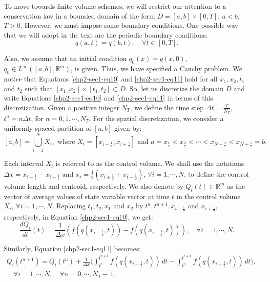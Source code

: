 To move towards finite volume schemes, we will restrict our attention
to a conservation law in a bounded domain of the form 
$D = [a,b]\times[0,T]$, $a<b$, $T>0$. However, we must 
impose some boundary conditions. One possible way that we will adopt 
in the text are the periodic boundary conditions:
\begin{equation}
	\label{chp2-sec1-eq12}
	{q}(a, t) = {q}(b, t),\quad \forall t \in [0, T].
\end{equation}

Also, we assume that an initial condition $q_0(x) = q(x,0)$, $q_0 \in L^{\infty}([a,b],\mathbb{R}^m)$, is given.
Thus, we have specified a Cauchy problem.
We notice that Equations \eqref{chp2-sec1-eq10} and \eqref{chp2-sec1-eq11}
hold for all $x_1, x_2, t_1$ and $t_2$ such that
$[x_1, x_2] \times [t_1, t_2] \subset D$.
So, let us discretize the domain $D$ and write 
Equations \eqref{chp2-sec1-eq10} and \eqref{chp2-sec1-eq11} in terms of this discretization.
Given a positive integer $N_T$, we define the time step 
$\Delta t = \frac{T}{N_T}$, $t^{n} = n \Delta t$, for $n = 0, 1 ,\cdots, N_T$.
For the spatial discretization, we consider a uniformly spaced partition of $[a, b]$ given by: 
\begin{equation}
	\label{chp2-sec1-eq13}
	[a,b] = \bigcup_{i=1}^N X_i, 
	\text{ where } X_i= [x_{i-\frac{1}{2}}, x_{i+\frac{1}{2}}] \text{ and } 
	a = x_{\frac{1}{2}} < x_{\frac{3}{2}} < \cdots < x_{N-\frac{1}{2}} < x_{N+\frac{1}{2}} = b.
\end{equation}

Each interval $X_i$ is referred to as the control volume. 
We shall use the notations $\Delta x = x_{i+\frac{1}{2}} - x_{i-\frac{1}{2}}$ 
and $x_i = \frac{1}{2}(x_{i+\frac{1}{2}} + x_{i-\frac{1}{2}})$, $\forall i = 1, \cdots, N$, 
to define the control volume length and centroid, respectively.
We also denote by ${Q}_i(t) \in \mathbb{R}^m$ as the vector of 
average values of state variable vector at time $t$
in the control volume $X_i$, $\forall i = 1, \cdots, N$. Replacing $t_1, t_2, x_1$ and 
$x_2$ by $t^{n}, t^{n+1}, x_{i-\frac{1}{2}}$ and $x_{i+\frac{1}{2}}$,
respectively, in Equation \eqref{chp2-sec1-eq10}, we get:
\begin{equation}
	\label{chp2-sec1-eq14}
	\frac{dQ_i}{dt} (t) = \frac{1}{\Delta x}
	({f}({q}(x_{i-\frac{1}{2}},t)) -
	{f}({q}(x_{i+\frac{1}{2}},t))) ,
	\quad \forall i = 1, \cdots, N.
\end{equation}

Similarly, Equation \eqref{chp2-sec1-eq11} becomes:
\begin{equation}
        \label{chp2-sec1-eq15}
	\begin{aligned}
		{Q}_i(t^{n+1}) =  {Q}_i(t^{n}) +
		\frac{1}{\Delta x}\bigg( \int_{t^{n}}^{t^{n+1}}
        	{f}({q}(x_{i-\frac{1}{2}}, t)) \,dt -
		\int_{t^{n}}^{t^{n+1}}{f}({q}(x_{i+\frac{1}{2}}, t)) \,dt \bigg),
       		\\
		\quad \forall i = 1, \cdots, N,
		\quad \forall n = 0, \cdots, N_T-1.
	\end{aligned}
\end{equation}

